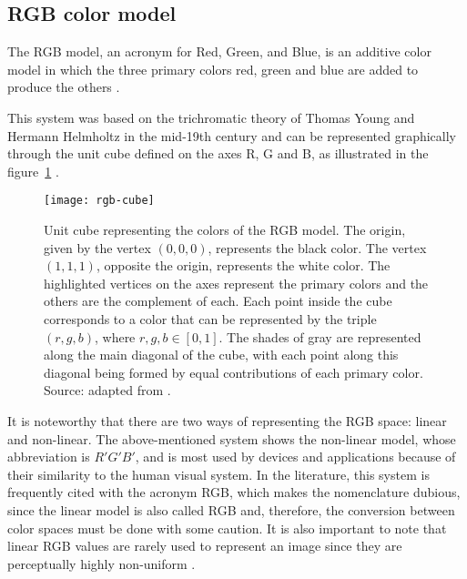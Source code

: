 \subsection{RGB color model}
\label{sec:modelo_cores_rgb}

The RGB model, an acronym for Red, Green, and Blue, is an additive color model in which the three primary colors red, green and blue are added to produce the others \citep{gonzalez:02}.

This system was based on the trichromatic theory of Thomas Young and Hermann Helmholtz in the mid-19th century and can be represented graphically
through the unit cube defined on the axes R, G and B, as illustrated in the figure~\ref{fig:rgb-cube} \citep{konstantinos:00}.

\begin{figure}[!h]
  \centering
  \texttt{[image: rgb-cube]}
  \caption[Unit cube representing the colors of the RGB model]{Unit cube representing the colors of the RGB model. The origin, given by the vertex $(0, 0, 0)$, represents the black color. The vertex $(1, 1, 1)$, opposite the origin, represents the white color. The highlighted vertices on the axes represent the primary colors and the others are the complement of each. Each point inside the cube corresponds to a color that can be represented by the triple $(r, g, b)$, where $r, g, b \in [0, 1]$. The shades of gray are represented along the main diagonal of the cube, with each point along this diagonal being formed by equal contributions of each primary color. Source: adapted from \citet{gonzalez:02}.}
  \label{fig:rgb-cube} 
\end{figure}

It is noteworthy that there are two ways of representing the RGB space: linear and non-linear. The above-mentioned system shows the non-linear model, whose abbreviation is $R'G'B'$, and is most used by devices and applications because of their similarity to the human visual system. In the literature, this system is frequently cited with the acronym RGB, which makes the nomenclature dubious, since the linear model is also called RGB and, therefore, the conversion between color spaces must be done with some caution. It is also important to note that linear RGB values are rarely used to represent an image since they are perceptually highly non-uniform \citep{konstantinos:00}.


